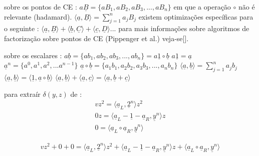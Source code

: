 \begin{appendices}
sobre os pontos de CE : \newline
$a\underline{B} = \{a B_1, a B_2, a B_3, ...,a B_n\}$\newline
em que a operação $\circ$ não é relevante (hadamard).\newline
$\langle\underline{a}, \underline{B}\rangle = \sum_{j=1}^{n} a_j B_j$\newline
existem optimizações específicas para o seguinte : \newline
$\langle\underline{a}, \underline{B}\rangle + \langle\underline{b}, \underline{C}\rangle + \langle\underline{c}, \underline{D}\rangle . . . $\newline
para mais informações sobre algoritmos de factorização sobre pontos de CE (Pippenger et al.) veja-se[].

sobre os escalares : \newline
$a\underline{b} = \{a b_1, a b_2, a b_3, ...,a b_n\} = a\underline{1}\circ \underline{b}$\newline
$a\underline{1} = \underline{a}$\newline
$\underline{a}^n = \{a^0, a^1, a^2, ...a^{n-1}\}$\newline
$\underline{a}\circ\underline{b} = \{a_1 b_1, a_2 b_2, a_3 b_3, ...,a_n b_n\}$\newline
$\langle\underline{a}, \underline{b}\rangle = \sum_{j=1}^{n} a_j b_j$\newline
$\langle\underline{a}, \underline{b}\rangle = \langle \underline{1}, \underline{a}\circ\underline{b}\rangle$\newline
$\langle\underline{a}, \underline{b}\rangle + \langle \underline{a}, \underline{c}\rangle = \langle \underline{a}, \underline{b} + \underline{c}\rangle$\newline

para extraír $\delta(y, z)$ de :
\begin{align*}
vz^2 = \langle\underline{a}_L, \underline{2}^n\rangle z^2\\
0z = \langle\underline{a}_L - \underline{1} - \underline{a}_R, \underline{y}^n\rangle z\\
0 = \langle\underline{a}_L \circ \underline{a}_R, \underline{y}^n\rangle
\end{align*}

\begin{align*}
vz^2 + 0 + 0 = \langle\underline{a}_L, \underline{2}^n\rangle z^2 + \langle\underline{a}_L - \underline{1} - \underline{a}_R, \underline{y}^n\rangle z + \langle\underline{a}_L \circ \underline{a}_R, \underline{y}^n\rangle
\end{align*}


\end{appendices}

